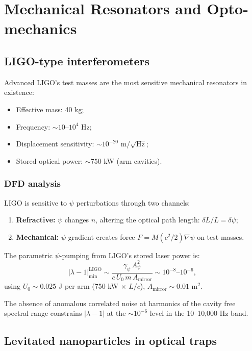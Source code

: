 \documentclass[12pt,letterpaper]{article}
\begin{document}
\section{Mechanical Resonators and Opto-mechanics}

\subsection{LIGO-type interferometers}

Advanced LIGO's test masses are the most sensitive mechanical resonators
in existence:
\begin{itemize}[noitemsep]
  \item Effective mass: 40 kg;
  \item Frequency: $\sim 10$--$10^4$ Hz;
  \item Displacement sensitivity: $\sim 10^{-20}$ m/$\sqrt{\text{Hz}}$;
  \item Stored optical power: $\sim 750$ kW (arm cavities).
\end{itemize}

\subsubsection{DFD analysis}

LIGO is sensitive to $\psi$ perturbations through two channels:
\begin{enumerate}[noitemsep]
  \item \textbf{Refractive:} $\psi$ changes $n$, altering the optical
    path length: $\delta L/L = \delta\psi$;
  \item \textbf{Mechanical:} $\psi$ gradient creates force
    $F = M(c^2/2)\nabla\psi$ on test masses.
\end{enumerate}

The parametric $\psi$-pumping from LIGO's stored laser power is:
\begin{equation}
  |\lambda - 1|_{\min}^{\text{LIGO}}
  \sim \frac{\gamma_\psi\,A_\psi^2}{c\,U_0\,m\,A_{\text{mirror}}}
  \sim 10^{-8}\text{--}10^{-6},
\end{equation}
using $U_0 \sim 0.025$ J per arm (750 kW $\times$ $L/c$),
$A_{\text{mirror}} \sim 0.01$ m$^2$.

The absence of anomalous correlated noise at harmonics of the cavity
free spectral range constrains $|\lambda - 1|$ at the $\sim 10^{-6}$
level in the 10--10,000 Hz band.

\subsection{Levitated nanoparticles in optical traps}
\end{document}
